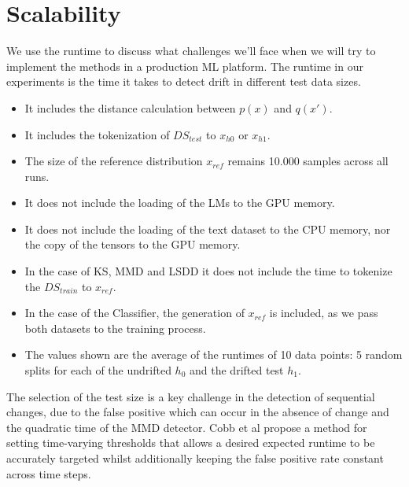 \documentclass[12pt]{report}
\begin{document}
\section{Scalability}
We use the runtime to discuss what challenges we'll face when we will try to implement the methods in a production ML platform.
The runtime in our experiments is the time it takes to detect drift in different test data sizes.
\begin{itemize}
    \item It includes the distance calculation between \(p(x)\) and \(q(x')\).
    \item It includes the tokenization of \(DS_{test}\) to \(x_{h0}\) or \(x_{h1}\).
    \item The size of the reference distribution \(x_{ref}\) remains 10.000 samples across all runs.
    \item It does not include the loading of the LMs to the GPU memory.
    \item It does not include the loading of the text dataset to the CPU memory, nor the copy of the tensors to the GPU memory.
    \item In the case of KS, MMD and LSDD it does not include the time to tokenize the \(DS_{train}\) to \(x_{ref}\).
    \item In the case of the Classifier, the generation of \(x_{ref}\) is included, as we pass both datasets to the training process.
    \item The values shown are the average of the runtimes of 10 data points: 5 random splits for each of the undrifted \(h_0\) and the drifted test \(h_1\).
\end{itemize}

The selection of the test size is a key challenge in the detection of sequential changes, due to the false positive which can occur in the absence of change and the quadratic time of the MMD detector.
Cobb et al \cite{cobbSequentialMultivariateChange2021} propose a method for setting time-varying thresholds that allows a desired expected runtime to be accurately targeted whilst additionally keeping the false positive rate constant across time steps.
\end{document}
